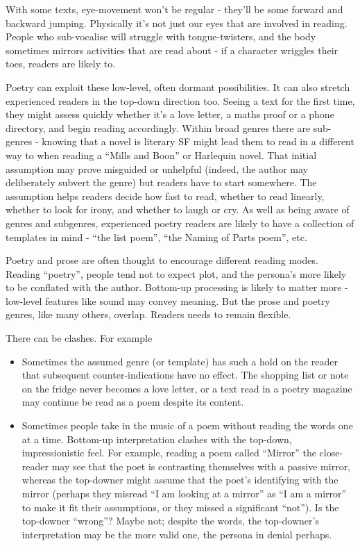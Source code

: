 \documentclass[11pt]{article}
\begin{document}
With some texts, eye-movement won't be regular - they'll be some forward and backward jumping. Physically it's not just our eyes that are involved in reading. People who sub-vocalise will struggle with tongue-twisters, and the body sometimes mirrors activities that are read about - if a character wriggles their toes, readers are likely to.


Poetry can exploit these low-level, often dormant possibilities. It can also stretch experienced readers in the top-down direction too. Seeing a text for the first time, they might assess quickly whether it's a love letter, a maths proof or a phone directory, and begin reading accordingly. Within broad genres there are sub-genres - knowing that a novel is literary SF might lead them to read in a different way to when reading a ``Mills and Boon'' or Harlequin novel. That initial assumption may prove misguided or unhelpful (indeed, the author may deliberately subvert the genre) but readers have to start somewhere. The assumption helps readers decide how fast to read, whether to read linearly, whether to look for irony, and whether to laugh or cry. As well as being aware of genres and subgenres, experienced poetry readers are likely to have a collection of templates in mind - ``the list poem'', ``the Naming of Parts poem'', etc.


Poetry and prose are often thought to encourage different reading modes. Reading ``poetry'', people tend not to expect plot, and the persona's more likely to be conflated with the author. Bottom-up processing is likely to matter more - low-level features like sound may convey meaning. But the prose and poetry genres, like many others, overlap. Readers needs to remain flexible. 


There can be clashes. For example
\begin{itemize}
\item Sometimes the assumed genre (or template) has such a hold on the reader that subsequent counter-indications have no effect. The shopping list or note on the fridge never becomes a love letter, or a  text read in a poetry magazine may continue be read as a poem despite its content. 


\item Sometimes people take in the music of a poem without reading the words one at a time. Bottom-up interpretation clashes with the top-down, impressionistic feel. For example,  reading a poem called ``Mirror'' the close-reader may see that the poet is contrasting themselves with a passive mirror, whereas the top-downer might assume that the poet's identifying with the mirror (perhaps they misread ``I am looking at a mirror'' as ``I am a mirror'' to make it fit their assumptions, or they missed a significant ``not''). Is the top-downer ``wrong''? Maybe not; despite the words, the top-downer's interpretation may be the more valid one, the persona in denial perhaps. 
\end{itemize}
\end{document}
